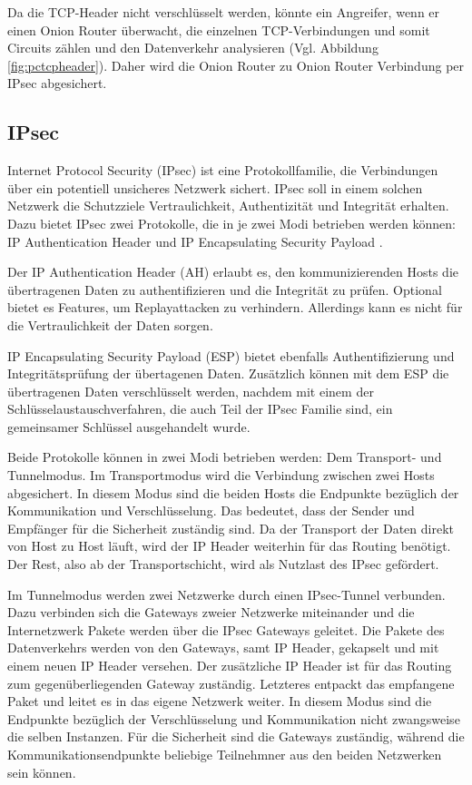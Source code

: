 \documentclass[fleqn,envcountsame,runningheads,10pt,a4paper]{llncs}
\begin{document}
Da die TCP-Header nicht verschlüsselt werden, könnte ein Angreifer, wenn er 
einen Onion Router überwacht, die einzelnen TCP-Ver\-bin\-dung\-en und somit 
Circuits zählen und den Datenverkehr analysieren (Vgl. Abbildung 
\ref{fig:pctcpheader}). Daher wird die Onion Router zu Onion Router Verbindung 
per IPsec abgesichert.

\subsection{IPsec}

Internet Protocol Security (IPsec) ist eine Protokollfamilie, die Verbindungen 
über ein potentiell unsicheres Netzwerk sichert. IPsec soll in einem solchen 
Netzwerk die Schutzziele Vertraulichkeit, Authentizität und Integrität erhalten. 
Dazu bietet IPsec zwei Protokolle, die in je zwei Modi betrieben werden können: 
IP Authentication Header \cite{rfc:ah} und IP Encapsulating Security Payload 
\cite{rfc:esp}.

Der IP Authentication Header (AH) erlaubt es, den kommunizierenden Hosts die 
übertragenen Daten zu authentifizieren und die Integrität zu prüfen. Optional 
bietet es Features, um Replayattacken zu verhindern. Allerdings kann es nicht 
für die Vertraulichkeit der Daten sorgen.

IP Encapsulating Security Payload (ESP) bietet ebenfalls Authentifizierung und 
In\-te\-gri\-täts\-prü\-fung der übertagenen Daten. Zusätzlich können mit dem 
ESP die übertragenen Daten verschlüsselt werden, nachdem mit einem der 
Schlüsselaustauschverfahren, die auch Teil der IPsec Familie sind, ein 
gemeinsamer Schlüssel ausgehandelt wurde. 

Beide Protokolle können in zwei Modi betrieben werden: Dem Transport- und 
Tunnelmodus. Im Transportmodus wird die Verbindung zwischen zwei Hosts 
abgesichert. In diesem Modus sind die beiden Hosts die Endpunkte bezüglich der 
Kommunikation und Verschlüsselung. Das bedeutet, dass der Sender und Empfänger 
für die Sicherheit zuständig sind. Da der Transport der Daten direkt von Host zu 
Host läuft, wird der IP Header weiterhin für das Routing benötigt. Der Rest, 
also ab der Transportschicht, wird als Nutzlast des IPsec gefördert.

Im Tunnelmodus werden zwei Netzwerke durch einen IPsec-Tunnel verbunden. Dazu 
verbinden sich die Gateways zweier Netzwerke miteinander und die Internetzwerk 
Pakete werden über die IPsec Gateways geleitet. Die Pakete des Datenverkehrs 
werden von den Gateways, samt IP Header, gekapselt und mit einem neuen IP 
Header versehen. Der zusätzliche IP Header ist für das Routing zum 
gegenüberliegenden Gateway zuständig. Letzteres entpackt das empfangene Paket 
und leitet es in das eigene Netzwerk weiter. In diesem Modus sind die Endpunkte 
bezüglich der Verschlüsselung und Kommunikation nicht zwangsweise die selben 
Instanzen. Für die Sicherheit sind die Gateways zuständig, während die 
Kommunikationsendpunkte beliebige Teilnehmner aus den beiden Netzwerken sein 
können.
\end{document}
